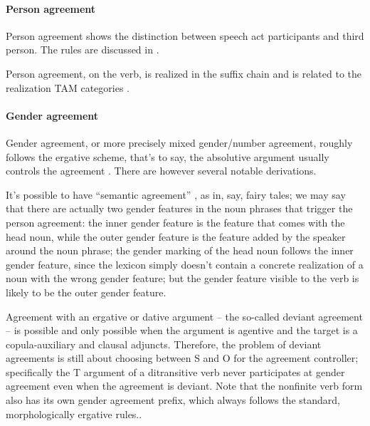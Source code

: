 \documentclass[a4paper, oneside, 12pt]{report}
\newcommand*{\citesec}[1]{\S~{#1}}
\newcommand*{\citepage}[1]{p.~{#1}}
\begin{document}
\paragraph*{Person agreement}
Person agreement shows the distinction between speech act participants and third person.
The rules are discussed in \citep[\citesec{20.3.2}]{forker2020grammar}.

Person agreement, on the verb, is realized in the suffix chain
and is related to the realization TAM categories 
\citet[\citesec{11.4}]{forker2020grammar}.

\paragraph*{Gender agreement}\label{sec:overview.alignment.gender-agreement}
Gender agreement, or more precisely mixed gender/number agreement, 
roughly follows the ergative scheme, that's to say, 
the absolutive argument usually controls the agreement \citep[\citepage{377}]{forker2020grammar}.
There are however several notable derivations.

It's possible to have ``semantic agreement''
\citep[\citesec{20.2.2}]{forker2020grammar},
as in, say, fairy tales; 
we may say that there are actually two gender features in the 
noun phrases that trigger the person agreement:
the inner gender feature is the feature that comes with the head noun, 
while the outer gender feature is the feature 
added by the speaker around the noun phrase;
the gender marking of the head noun follows the inner gender feature, 
since the lexicon simply doesn't contain a concrete realization 
of a noun with the wrong gender feature;
but the gender feature visible to the verb 
is likely to be the outer gender feature. 

Agreement with an ergative or dative argument  -- 
the so-called deviant agreement --
is possible and only possible when the argument is agentive 
and the target is a copula-auxiliary and clausal adjuncts. 
Therefore, the problem of deviant agreements is still about 
choosing between S and O for the agreement controller;
specifically the T argument of a ditransitive verb never participates at gender agreement 
even when the agreement is deviant.
Note that the nonfinite verb form also has its own gender agreement prefix, 
which always follows the standard, morphologically ergative rules..
\end{document}
